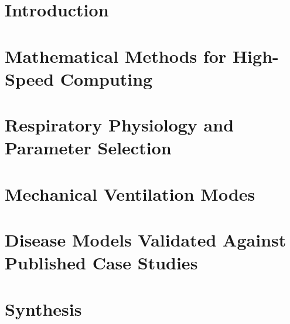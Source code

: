 \part{Introduction}


\part{Mathematical Methods for High-Speed Computing}



\part{Respiratory Physiology and Parameter Selection}







\part{Mechanical Ventilation Modes}








\part{Disease Models Validated Against Published Case Studies}


\part{Synthesis}


\appendix




